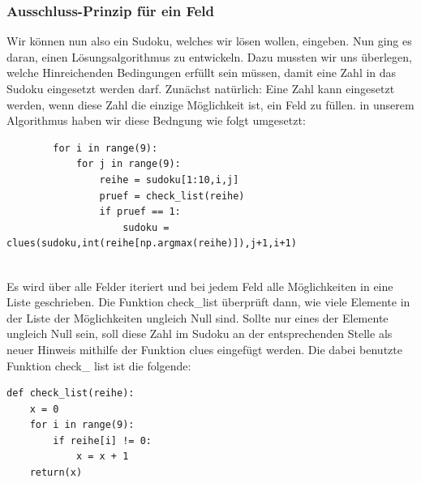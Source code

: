 \documentclass[11pt,a4paper]{article}
\begin{document}
\subsubsection{Ausschluss-Prinzip für ein Feld}
Wir können nun also ein Sudoku, welches wir lösen wollen, eingeben.
Nun ging es daran, einen Lösungsalgorithmus zu entwickeln. Dazu mussten wir uns überlegen, welche Hinreichenden Bedingungen erfüllt sein müssen, damit eine Zahl in das Sudoku eingesetzt werden darf. Zunächst natürlich: Eine Zahl kann eingesetzt werden, wenn diese Zahl die einzige Möglichkeit ist, ein Feld zu füllen. in unserem Algorithmus haben wir diese Bedngung wie folgt umgesetzt:
\ \\
\begin{verbatim}
        for i in range(9):           
            for j in range(9):       
                reihe = sudoku[1:10,i,j]                                     
                pruef = check_list(reihe)      
                if pruef == 1:            
                    sudoku = clues(sudoku,int(reihe[np.argmax(reihe)]),j+1,i+1) 
\end{verbatim}
\ \\
Es wird über alle Felder iteriert und bei jedem Feld alle Möglichkeiten in eine Liste geschrieben. Die Funktion check\_list überprüft dann, wie viele Elemente in der Liste der Möglichkeiten ungleich Null sind. Sollte nur eines der Elemente ungleich Null sein, soll diese Zahl im Sudoku an der entsprechenden Stelle als neuer Hinweis mithilfe der Funktion clues eingefügt werden. Die dabei benutzte Funktion check\_ list ist die folgende:
\ \\
\begin{verbatim}
def check_list(reihe):
    x = 0
    for i in range(9):
        if reihe[i] != 0:
            x = x + 1
    return(x) 
\end{verbatim}
\ \\
\end{document}
